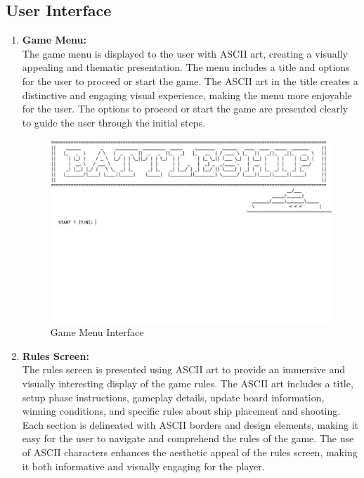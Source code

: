\newpage
\subsection{User Interface}
\begin{enumerate}
    \item \textbf{Game Menu:} \\
    
    The game menu is displayed to the user with ASCII art, creating a visually appealing and thematic presentation. The menu includes a title and options for the user to proceed or start the game. The ASCII art in the title creates a distinctive and engaging visual experience, making the menu more enjoyable for the user. The options to proceed or start the game are presented clearly to guide the user through the initial steps.\\

    \vspace*{2cm}

    \begin{figure}[H]
        \centering
        \includegraphics[width=15cm]{graphics/menu.jpg}
        \caption{Game Menu Interface}
    \end{figure}

    \newpage
    \item \textbf{Rules Screen:} \\
    
    The rules screen is presented using ASCII art to provide an immersive and visually interesting display of the game rules. The ASCII art includes a title, setup phase instructions, gameplay details, update board information, winning conditions, and specific rules about ship placement and shooting. Each section is delineated with ASCII borders and design elements, making it easy for the user to navigate and comprehend the rules of the game. The use of ASCII characters enhances the aesthetic appeal of the rules screen, making it both informative and visually engaging for the player.\\


\end{enumerate}
